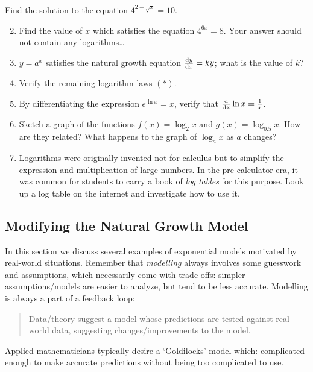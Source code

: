 \begin{exercises}{}{}
\exstart Find the solution to the equation $4^{2-\sqrt x}=10$.
\begin{enumerate}\setcounter{enumi}{1}
  \item Find the value of $x$ which satisfies the equation $4^{6x}=8$. Your answer should not contain any logarithms\ldots

  \item $y=a^x$ satisfies the natural growth equation $\diff[y]x=ky$; what is the value of $k$?
  
	\item Verify the remaining logarithm laws $(\ast)$.
  \item By differentiating the expression $e^{\ln x}=x$, verify that $\diff x\ln x=\frac 1x$.
  
  \item Sketch a graph of the functions $f(x)=\log_2x$ and $g(x)=\log_{0.5}x$. How are they related? What happens to the graph of $\log_ax$ as $a$ changes?

  \item Logarithms were originally invented not for calculus but to simplify the expression and multiplication of large numbers. In the pre-calculator era, it was common for students to carry a book of \emph{log tables} for this purpose. Look up a log table on the internet and investigate how to use it.
\end{enumerate}
\end{exercises}


\clearpage


\subsection{Modifying the Natural Growth Model}

In this section we discuss several examples of exponential models motivated by real-world situations. Remember that \emph{modelling} always involves some guesswork and assumptions, which necessarily come with trade-offs: simpler assumptions/models are easier to analyze, but tend to be less accurate. Modelling is always a part of a feedback loop:
\begin{quote}
Data/theory suggest a model whose predictions are tested against real-world data, suggesting changes/improvements to the model.
\end{quote}
Applied mathematicians typically desire a `Goldilocks' model which: complicated enough to make accurate predictions without being too complicated to use.


